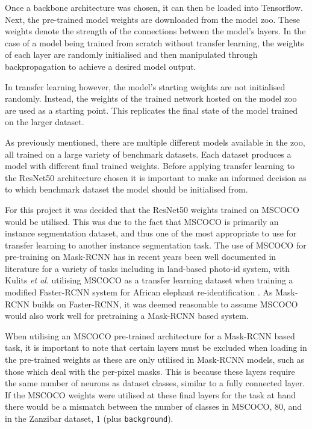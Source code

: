 Once a backbone architecture was chosen, it can then be loaded into Tensorflow. Next, the pre-trained model weights are downloaded from the model zoo. These weights denote the strength of the connections between the model's layers. In the case of a model being trained from scratch without transfer learning, the weights of each layer are randomly initialised and then manipulated through backpropagation to achieve a desired model output. 

In transfer learning however, the model's starting weights are not initialised randomly. Instead, the weights of the trained network hosted on the model zoo are used as a starting point. This replicates the final state of the model trained on the larger dataset. 

As previously mentioned, there are multiple different models available in the zoo, all trained on a large variety of benchmark datasets. Each dataset produces a model with different final trained weights. Before applying transfer learning to the ResNet50 architecture chosen it is important to make an informed decision as to which benchmark dataset the model should be initialised from. 

For this project it was decided that the ResNet50 weights trained on MSCOCO \cite{lin_microsoft_2014} would be utilised. This was due to the fact that MSCOCO is primarily an instance segmentation dataset, and thus one of the most appropriate to use for transfer learning to another instance segmentation task. The use of MSCOCO for pre-training on Mask-RCNN has in recent years been well documented in literature for a variety of tasks \cite{yu_fruit_2019, couteaux_automatic_2019, fujita_fine-tuned_2020} including in land-based photo-id system, with Kulits \textit{et al}. utilising MSCOCO as a transfer learning dataset when training a modified Faster-RCNN system for African elephant re-identification \cite{kulits_elephantbook_2021}. As Mask-RCNN builds on Faster-RCNN, it was deemed reasonable to assume MSCOCO would also work well for pretraining a Mask-RCNN based system.

When utilising an MSCOCO pre-trained architecture for a Mask-RCNN based task, it is important to note that certain layers must be excluded when loading in the pre-trained weights as these are only utilised in Mask-RCNN models, such as those which deal with the per-pixel masks. This is because these layers require the same number of neurons as dataset classes, similar to a fully connected layer. If the MSCOCO weights were utilised at these final layers for the task at hand there would be a mismatch between the number of classes in MSCOCO, 80, and in the Zanzibar dataset, 1 (plus \texttt{background}).

